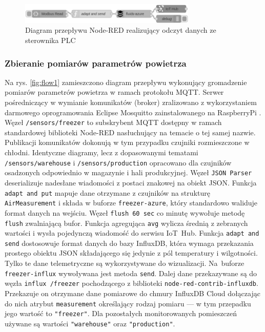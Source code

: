 \documentclass[a4paper, 12pt, twoside]{article}
\begin{document}
\begin{figure}[h]
      \centering
      \includegraphics[width=0.75\textwidth]{flow3.png}
      \caption{Diagram przepływu Node-RED realizujący odczyt danych ze sterownika PLC}
      \label{fig:flow3}
\end{figure}

\subsubsection{Zbieranie pomiarów parametrów powietrza }

Na rys. \ref{fig:flow1} zamieszczono diagram przepływu wykonujący gromadzenie pomiarów parametrów
powietrza w ramach protokołu MQTT. Serwer pośredniczący w wymianie komunikatów
(broker) zralizowano z wykorzystaniem darmowego oprogramowania
Eclipse Mosquitto zainstalowanego na RaspberryPi \cite{mosquitto}. Węzeł
\texttt{/sensors/freezer} to subskrybent MQTT dostępny w ramach standardowej
biblioteki Node-RED nasłuchujący na temacie o tej samej nazwie. Publikacji
komunikatów  dokonują w tym przypadku czujniki rozmieszczone w
chłodni. Identyczne diagramy, lecz z dopasowanymi tematami \texttt{/sensors/warehouse} i
\texttt{/sensors/production} opracowano dla czujników osadzonych odpowiednio
w magazynie i hali produkcyjnej. Węzeł \texttt{JSON Parser} deserializuje
nadesłane wiadomości z postaci znakowej na obiekt JSON. Funkcja \texttt{adapt and put}
mapuje dane otrzymane z czujników na strukturę \texttt{AirMeasurement}
i składa w buforze \texttt{freezer-azure}, który standardowo waliduje format
danych na wejściu. Węzeł \texttt{flush 60 sec} co minutę wywołuje metodę \texttt{flush}
zwalniającą bufor. Funkcja agregująca \texttt{avg} wylicza średnią z zebranych
wartości i wysła pojedynczą wiadomość do serwisu IoT~Hub. Funkcja \texttt{adapt and send}
dostosowuje format danych do bazy InfluxDB, która wymaga przekazania
prostego obiektu JSON składającego się jedynie z pól temperatury i wilgotności.
Tylko te dane telemetryczne są wykorzystywane do wizualizacji. Na~buforze
\texttt{freezer-influx} wywoływana jest metoda \texttt{send}. Dalej dane
przekazywane są do węzła \texttt{influx /freezer} pochodzącego z biblioteki
\texttt{node-red-contrib-influxdb}. Przekazuje on otrzymane dane pomiarowe
do chmury InfluxDB Cloud dołączając do nich atrybut \texttt{measurement}
określający rodzaj pomiaru --- w tym przepadku jego wartość to \texttt{"freezer"}.
Dla pozostałych monitorowanych pomieszczeń używane są wartości \texttt{"warehouse"}
oraz \texttt{"production"}.
\end{document}
